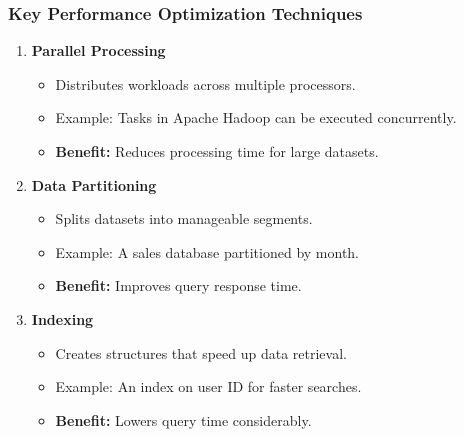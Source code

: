 \documentclass{beamer}
\begin{document}
\begin{frame}[fragile]
    \frametitle{Key Performance Optimization Techniques}
    \begin{enumerate}
        \item \textbf{Parallel Processing}
        \begin{itemize}
            \item Distributes workloads across multiple processors.
            \item Example: Tasks in Apache Hadoop can be executed concurrently.
            \item \textbf{Benefit:} Reduces processing time for large datasets.
        \end{itemize}
        
        \item \textbf{Data Partitioning}
        \begin{itemize}
            \item Splits datasets into manageable segments.
            \item Example: A sales database partitioned by month.
            \item \textbf{Benefit:} Improves query response time.
        \end{itemize}

        \item \textbf{Indexing}
        \begin{itemize}
            \item Creates structures that speed up data retrieval.
            \item Example: An index on user ID for faster searches.
            \item \textbf{Benefit:} Lowers query time considerably.
        \end{itemize}
    \end{enumerate}
\end{frame}
\end{document}
